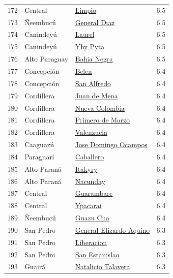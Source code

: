 {\begin{longtable}[]{@{}llll@{}}
172 & Central & \hyperref[dist:11_Central:Limpio]{Limpio} & 6.5 \\
173 & Ñeembucú & \hyperref[dist:12_Neembucu:General_Diaz]{General Diaz} & 6.5 \\
174 & Canindeyú & \hyperref[dist:14_Canindeyu:Laurel]{Laurel} & 6.5 \\
175 & Canindeyú & \hyperref[dist:14_Canindeyu:Yby_Pyta]{Yby Pyta} & 6.5 \\
176 & Alto Paraguay & \hyperref[dist:17_Alto_Paraguay:Bahia_Negra]{Bahia Negra} & 6.5 \\
177 & Concepción & \hyperref[dist:01_Concepción:Belen]{Belen} & 6.4 \\
178 & Concepción & \hyperref[dist:01_Concepción:San_Alfredo]{San Alfredo} & 6.4 \\
179 & Cordillera & \hyperref[dist:03_Cordillera:Juan_de_Mena]{Juan de Mena} & 6.4 \\
180 & Cordillera & \hyperref[dist:03_Cordillera:Nueva_Colombia]{Nueva Colombia} & 6.4 \\
181 & Cordillera & \hyperref[dist:03_Cordillera:Primero_de_Marzo]{Primero de Marzo} & 6.4 \\
182 & Cordillera & \hyperref[dist:03_Cordillera:Valenzuela]{Valenzuela} & 6.4 \\
183 & Caaguazú & \hyperref[dist:05_Caaguazu:Jose_Domingo_Ocampos]{Jose Domingo Ocampos} & 6.4 \\
184 & Paraguarí & \hyperref[dist:09_Paraguari:Caballero]{Caballero} & 6.4 \\
185 & Alto Paraná & \hyperref[dist:10_Alto_Parana:Itakyry]{Itakyry} & 6.4 \\
186 & Alto Paraná & \hyperref[dist:10_Alto_Parana:Nacunday]{Nacunday} & 6.4 \\
187 & Central & \hyperref[dist:11_Central:Guarambare]{Guarambare} & 6.4 \\
188 & Central & \hyperref[dist:11_Central:Ypacarai]{Ypacarai} & 6.4 \\
189 & Ñeembucú & \hyperref[dist:12_Neembucu:Guazu_Cua]{Guazu Cua} & 6.4 \\
190 & San Pedro & \hyperref[dist:02_San_Pedro:General_Elizardo_Aquino]{General Elizardo Aquino} & 6.3 \\
191 & San Pedro & \hyperref[dist:02_San_Pedro:Liberacion]{Liberacion} & 6.3 \\
192 & San Pedro & \hyperref[dist:02_San_Pedro:San_Estanislao]{San Estanislao} & 6.3 \\
193 & Guairá & \hyperref[dist:04_Guaira:Natalicio_Talavera]{Natalicio Talavera} & 6.3 \\

\end{longtable}}
